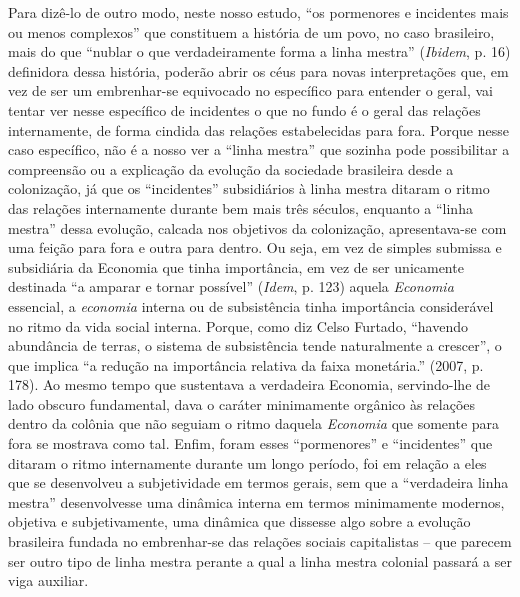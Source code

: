 Para dizê-lo de outro modo, neste nosso estudo, ``os pormenores e
incidentes mais ou menos complexos'' que constituem a história de um
povo, no caso brasileiro, mais do que ``nublar o que verdadeiramente
forma a linha mestra'' (\emph{Ibidem}, p. 16) definidora dessa história,
poderão abrir os céus para novas interpretações que, em vez de ser um
embrenhar-se equivocado no específico para entender o geral, vai tentar
ver nesse específico de incidentes o que no fundo é o geral das relações
internamente, de forma cindida das relações estabelecidas para fora.
Porque nesse caso específico, não é a nosso ver a ``linha mestra'' que
sozinha pode possibilitar a compreensão ou a explicação da evolução da
sociedade brasileira desde a colonização, já que os ``incidentes''
subsidiários à linha mestra ditaram o ritmo das relações internamente
durante bem mais três séculos, enquanto a ``linha mestra'' dessa
evolução, calcada nos objetivos da colonização, apresentava-se com uma
feição para fora e outra para dentro. Ou seja, em vez de simples
submissa e subsidiária da Economia que tinha importância, em vez de ser
unicamente destinada ``a amparar e tornar possível'' (\emph{Idem}, p.
123) aquela \emph{Economia} essencial, a \emph{economia} interna ou de
subsistência tinha importância considerável no ritmo da vida social
interna. Porque, como diz Celso Furtado, ``havendo abundância de terras,
o sistema de subsistência tende naturalmente a crescer'', o que implica
``a redução na importância relativa da faixa monetária.'' (2007, p.
178). Ao mesmo tempo que sustentava a verdadeira Economia, servindo-lhe
de lado obscuro fundamental, dava o caráter minimamente orgânico às
relações dentro da colônia que não seguiam o ritmo daquela
\emph{Economia} que somente para fora se mostrava como tal. Enfim, foram
esses ``pormenores'' e ``incidentes'' que ditaram o ritmo internamente
durante um longo período, foi em relação a eles que se desenvolveu a
subjetividade em termos gerais, sem que a ``verdadeira linha mestra''
desenvolvesse uma dinâmica interna em termos minimamente modernos,
objetiva e subjetivamente, uma dinâmica que dissesse algo sobre a
evolução brasileira fundada no embrenhar-se das relações sociais
capitalistas -- que parecem ser outro tipo de linha mestra perante a
qual a linha mestra colonial passará a ser viga auxiliar.

